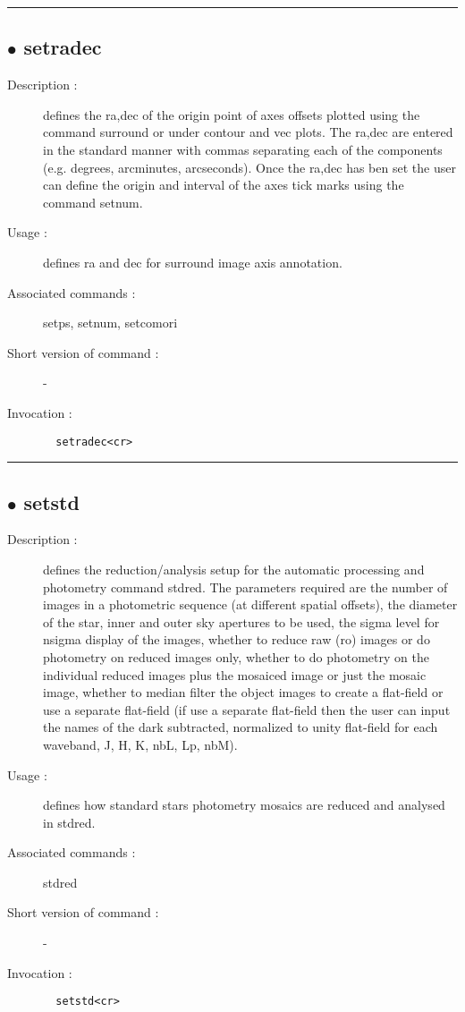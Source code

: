 \hrule \subsection*{$\bullet$ setradec}
\begin{description}
\item[Description :] defines the ra,dec of the origin point of axes offsets plotted
using the command surround or under contour and vec plots.  The ra,dec
are entered in the standard manner with commas separating each of the
components (e.g. degrees, arcminutes, arcseconds).  Once the ra,dec has
ben set the user can define the origin and interval of the axes tick
marks using the command setnum.  
\item[Usage :] defines ra and dec for surround image axis annotation.
\item[Associated commands :] setps, setnum, setcomori
\item[Short version of command :] -
\item[Invocation :]

\verb+  setradec<cr> +\end{description}

\hrule \subsection*{$\bullet$ setstd}
\begin{description}
\item[Description :] defines the reduction/analysis setup for the automatic
processing and photometry command stdred.  The parameters required are
the number of images in a photometric sequence (at different spatial
offsets), the diameter of the star, inner and outer sky apertures to be
used, the sigma level for nsigma display of the images, whether to reduce
raw (ro) images or do photometry on reduced images only, whether to do
photometry on the individual reduced images plus the mosaiced image or
just the mosaic image, whether to median filter the object images to
create a flat-field or use a separate flat-field (if use a separate
flat-field then the user can input the names of the dark subtracted,
normalized to unity flat-field for each waveband, J, H, K, nbL, Lp, nbM).
\item[Usage :] defines how standard stars photometry mosaics are reduced and
analysed in stdred.
\item[Associated commands :] stdred
\item[Short version of command :] -
\item[Invocation :]

\verb+  setstd<cr> +\end{description}

